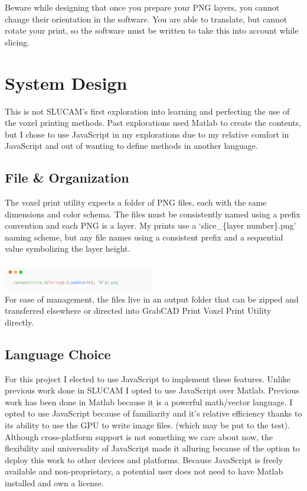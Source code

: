 \documentclass{article}
\begin{document}
\begin{multicols}{2}
\noindent
Beware while designing that once you prepare your PNG layers, you cannot change their orientation in the software. You are able to translate, but cannot rotate your print, so the software must be written to take this into account while slicing. 

\section{System Design}

This is not SLUCAM's first exploration into learning and perfecting the use of the voxel printing methods. Past explorations used Matlab to create the contents, but I chose to use JavaScript in my explorations due to my relative comfort in JavaScript and out of wanting to define methods in another language.

\subsection{File \& Organization}
The voxel print utility expects a folder of PNG files, each with the same dimensions and color schema. The files must be consistently named using a prefix convention and each PNG is a layer. My prints use a `slice\_\{layer number\}.png' naming scheme, but any file names using a consistent prefix and a sequential value symbolizing the layer height.
\\\\
\noindent
\includegraphics[width=0.5\textwidth]{string-padding}
\\

\noindent
For ease of management, the files live in an output folder that can be zipped and transferred elsewhere or directed into GrabCAD Print Voxel Print Utility directly. 

\subsection{Language Choice}

For this project I elected to use JavaScript to implement these features. Unlike previous work done in SLUCAM I opted to use JavaScript over Matlab. Previous work has been done in Matlab because it is a powerful math/vector language. I opted to use JavaScript because of familiarity and it's relative efficiency thanks to its ability to use the GPU to write image files. (which may be put to the test). Although cross-platform support is not something we care about now, the flexibility and universality of JavaScript made it alluring because of the option to deploy this work to other devices and platforms. Because JavaScript is freely available and non-proprietary, a potential user does not need to have Matlab installed and own a license.


\end{multicols}
\end{document}

